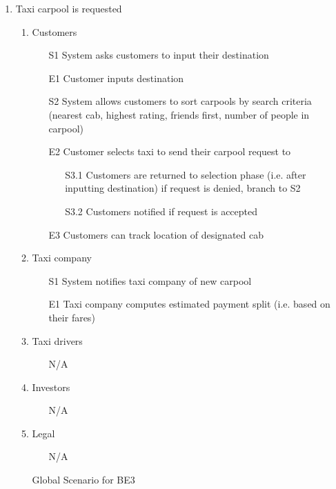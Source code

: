 \documentclass[]{article}
\begin{document}
\begin{enumerate}[{BE}1.]
\begin{enumerate}[{VP2}.1]
\begin{enumerate}
\begin{enumerate}
				\end{enumerate}
			\end{enumerate}
	\end{enumerate}
	\item Taxi carpool is requested
	\begin{enumerate}[{VP3}.1]
		\item Customers
			\begin{enumerate}
				\item[S1] System asks customers to input their destination
				\item[E1] Customer inputs destination
				\item[S2] System allows customers to sort carpools by search criteria (nearest cab, highest rating, friends first, number of people in carpool)
				\item[E2] Customer selects taxi to send their carpool request to
				\begin{enumerate}
					\item[S3.1] Customers are returned to selection phase (i.e. after inputting destination) if request is denied, branch to S2
					\item[S3.2] Customers notified if request is accepted
				\end{enumerate}
				\item[E3] Customers can track location of designated cab
			\end{enumerate}
		\item Taxi company
			\begin{enumerate}
				\item[S1] System notifies taxi company of new carpool
				\item[E1] Taxi company computes estimated payment split (i.e. based on their fares)
			\end{enumerate}
		\item Taxi drivers
			\begin{enumerate}
				\item[N/A]
			\end{enumerate}
		\item Investors
			\begin{enumerate}
				\item[N/A]
			\end{enumerate}
		\item Legal
			\begin{enumerate}
				\item[N/A]
			\end{enumerate}
		\item[Global] Scenario for BE3

\end{enumerate}
\end{enumerate}
\end{document}
